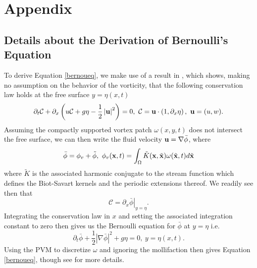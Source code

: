 \documentclass[a4paper,11pt]{article}
\newcommand{\p}{\partial}
\begin{document}
\section*{Appendix}

\subsection*{Details about the Derivation of Bernoulli's Equation}

To derive Equation \eqref{bernoueq}, we make use of a result in \cite{kalisch2}, which shows, making no assumption on the behavior of the vorticity, that the following conservation law holds at the free surface $y=\eta(x,t)$
\[
\p_{t} \mathcal{C} + \p_{x}\left(u\mathcal{C} + g\eta - \frac{1}{2}\left|{\bf u}\right|^{2} \right) = 0, ~ \mathcal{C} = {\bf u}\cdot \left(1,\p_{x}\eta\right), ~ {\bf u} = (u,w).
\]
Assuming the compactly supported vortex patch $\omega(x,y,t)$ does not intersect the free surface, we can then write the fluid velocity ${\bf u} = \nabla \bar{\phi}$, where 
\[
\bar{\phi} =  \phi_{v}+\tilde{\phi}, ~\phi_{v}({\bf x},t) = \int_{\Omega} \tilde{K}({\bf x},\tilde{{\bf x}})\omega(\tilde{{\bf x}},t) d\tilde{{\bf x}}
\]
where $\tilde{K}$ is the associated harmonic conjugate to the stream function which defines the Biot-Savart kernels and the periodic extensions thereof.  We readily see then that
\[
\mathcal{C} =  \p_{x}\left. \bar{\phi}\right|_{y=\eta}.
\]
Integrating the conservation law in $x$ and setting the associated integration constant to zero then gives us the Bernoulli equation for $\bar{\phi}$ at $y=\eta$ i.e. 
\[
\p_{t}\bar{\phi} + \frac{1}{2}\left|\nabla \bar\phi\right|^{2} + g\eta = 0, ~ y=\eta(x,t).
\]
Using the PVM to discretize $\omega$ and ignoring the mollifaction then gives Equation \eqref{bernoueq}, though see \cite{curtis} for more details.  
\end{document}
